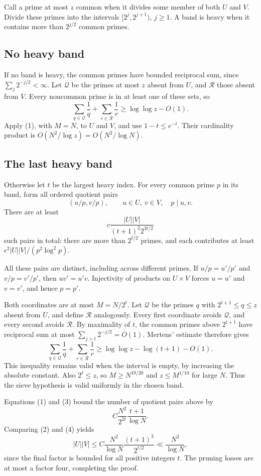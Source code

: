 Call a prime at most $z$ common when it divides some member of both $U$ and $V$. Divide these primes into the intervals $[2^j,2^{j+1})$, $j\ge1$. A band is heavy when it contains more than $2^{j/2}$ common primes.

\subsection*{No heavy band}
If no band is heavy, the common primes have bounded reciprocal sum, since $\sum_j2^{-j/2}<\infty$. Let $\mathcal Q$ be the primes at most $z$ absent from $U$, and $\mathcal R$ those absent from $V$. Every noncommon prime is in at least one of these sets, so
\[\sum_{q\in\mathcal Q}\frac1q+\sum_{r\in\mathcal R}\frac1r
\ge\log\log z-O(1).
\]
Apply (1), with $M=N$, to $U$ and $V$, and use $1-t\le e^{-t}$. Their cardinality product is $O(N^2/\log z)=O(N^2/\log N)$.

\subsection*{The last heavy band}
Otherwise let $t$ be the largest heavy index. For every common prime $p$ in its band, form all ordered quotient pairs
\[(u/p,v/p),\qquad u\in U,\ v\in V,\quad p\mid u,v.
\]
There are at least
\[c\frac{|U||V|}{(t+1)^2 2^{3t/2}}\tag{2}\]
such pairs in total: there are more than $2^{t/2}$ primes, and each contributes at least $\epsilon^2|U||V|/(p^2\log^2p)$.

All these pairs are distinct, including across different primes. If $u/p=u'/p'$ and $v/p=v'/p'$, then $uv'=u'v$. Injectivity of products on $U\times V$ forces $u=u'$ and $v=v'$, and hence $p=p'$.

Both coordinates are at most $M=N/2^t$. Let $\mathcal Q$ be the primes $q$ with $2^{t+1}\le q\le z$ absent from $U$, and define $\mathcal R$ analogously. Every first coordinate avoids $\mathcal Q$, and every second avoids $\mathcal R$. By maximality of $t$, the common primes above $2^{t+1}$ have reciprocal sum at most $\sum_{j>t}2^{-j/2}=O(1)$. Mertens' estimate therefore gives
\[\sum_{q\in\mathcal Q}\frac1q+\sum_{r\in\mathcal R}\frac1r
\ge\log\log z-\log(t+1)-O(1).\tag{3}\]
This inequality remains valid when the interval is empty, by increasing the absolute constant. Also $2^t\le z$, so $M\ge N^{19/20}$ and $z\le M^{1/10}$ for large $N$. Thus the sieve hypothesis is valid uniformly in the chosen band.

Equations (1) and (3) bound the number of quotient pairs above by
\[C\frac{N^2}{2^{2t}}\frac{t+1}{\log N}.\tag{4}\]
Comparing (2) and (4) yields
\[|U||V|\le C\frac{N^2}{\log N}\frac{(t+1)^3}{2^{t/2}}
\ll\frac{N^2}{\log N},
\]
since the final factor is bounded for all positive integers $t$. The pruning losses are at most a factor four, completing the proof.

